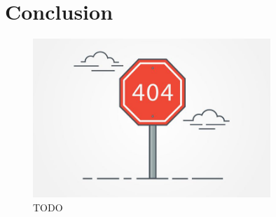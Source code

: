 \documentclass[12pt]{report}
\begin{document}
\chapter{Conclusion}

\begin{figure}[H]
    \centering
    \includegraphics[width=0.8\textwidth]{404}
    \caption{TODO}
\end{figure}
\end{document}
